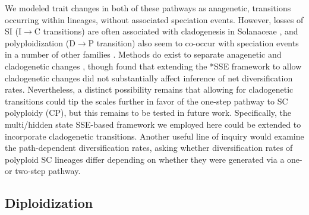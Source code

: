 We modeled trait changes in both of these pathways as anagenetic, transitions occurring within lineages, without associated speciation events.
However, losses of SI (I$\rightarrow$C transitions) are often associated with cladogenesis in Solanaceae \citep{goldberg_2012}, and polyploidization (D$\rightarrow$P transition) also seem to co-occur with speciation events in a number of other families \citep{zhan_2016, freyman_2017}.
Methods do exist to separate anagenetic and cladogenetic changes \citep{mayrose_2011, goldberg_2012, magnuson-ford_2012}, though \citet{goldberg_2012} found that extending the *SSE framework to allow cladogenetic changes did not substantially affect inference of net diversification rates.
Nevertheless, a distinct possibility remains that allowing for cladogenetic transitions could tip the scales further in favor of the one-step pathway to SC polyploidy (CP), but this remains to be tested in future work. %
Specifically, the multi/hidden state SSE-based framework we employed here could be extended to incorporate cladogenetic transitions. %
Another useful line of inquiry would examine the path-dependent diversification rates, asking whether diversification rates of polyploid SC lineages differ depending on whether they were generated via a one- or two-step pathway. %
%
%
%
%

\subsection*{Diploidization}

